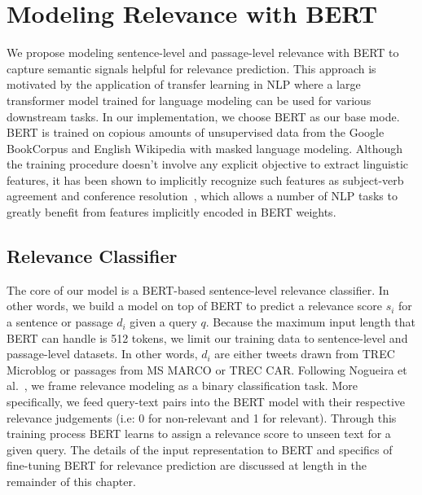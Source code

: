 \section{Modeling Relevance with BERT}

We propose modeling sentence-level and passage-level relevance with BERT to capture semantic signals helpful for relevance prediction.
This approach is motivated by the application of transfer learning in NLP where a large transformer model trained for language modeling can be used for various downstream tasks.
In our implementation, we choose BERT as our base mode.
BERT is trained on copious amounts of unsupervised data from the Google BookCorpus and English Wikipedia with masked language modeling.
Although the training procedure doesn't involve any explicit objective to extract linguistic features, it has been shown to implicitly recognize such features as subject-verb agreement and conference resolution~\cite{jawahar2019does, clark2019does}, which allows a number of NLP tasks to greatly benefit from features implicitly encoded in BERT weights.

\subsection{Relevance Classifier}

The core of our model is a BERT-based sentence-level relevance classifier.
In other words, we build a model on top of BERT to predict a relevance score $ s_i $ for a sentence or passage $ d_i $ given a query $ q $.
Because the maximum input length that BERT can handle is 512 tokens, we limit our training data to sentence-level and passage-level datasets.
In other words, $ d_i $ are either tweets drawn from TREC Microblog or passages from MS MARCO or TREC CAR.
Following Nogueira et al.~\cite{nogueira2019passage}, we frame relevance modeling as a binary classification task.
More specifically, we feed query-text pairs into the BERT model with their respective relevance judgements (i.e: 0 for non-relevant and 1 for relevant).
Through this training process BERT learns to assign a relevance score to unseen text for a given query.
The details of the input representation to BERT and specifics of fine-tuning BERT for relevance prediction are discussed at length in the remainder of this chapter.

